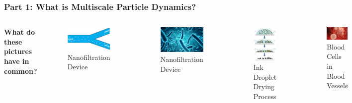 \documentclass[aspectratio=169,xcolor=dvipsnames]{beamer}
\begin{document}
\begin{frame}
	\frametitle{Part 1: What is Multiscale Particle Dynamics?}
	
	\begin{columns}
	\textbf{What do these pictures have in common?}\\
		
		\begin{columns}	
			\begin{figure}
				\includegraphics[width=4cm]{Microfilter.png}
				\caption{ Nanofiltration Device}
			\end{figure}
		\begin{figure}
			\includegraphics[width=4cm]{bacteria.png}
			\caption{ Nanofiltration Device}
		\end{figure}
			\begin{figure}		
				\includegraphics[width=4cm]{printing1.png}
				\caption{Ink Droplet Drying Process}
			\end{figure}
		\end{columns}
		
		\begin{figure}
			\includegraphics[width=4cm]{bloodcells.jpg}
			\caption{Blood Cells in Blood Vessels}
		\end{figure}
		\begin{figure}
			\includegraphics[width=4cm]{beer.png}
			\caption{Yeast Sedimentation in Beer}
		\end{figure}
		

\end{columns}
\end{frame}
\end{document}

